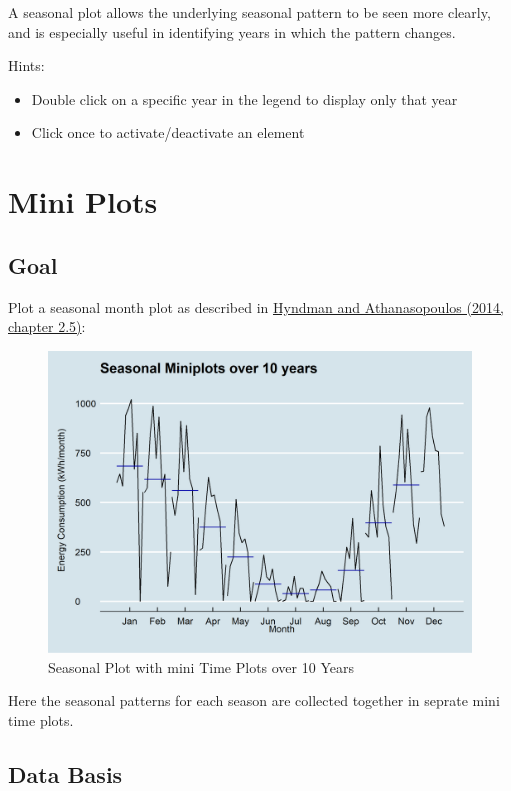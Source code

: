 \documentclass[
  a4paperpaper,
]{book}
\providecommand{\tightlist}{%
  \setlength{\itemsep}{0pt}\setlength{\parskip}{0pt}}
\begin{document}
A seasonal plot allows the underlying seasonal pattern to be seen more clearly, and is especially useful in identifying years in which the pattern changes.

Hints:

\begin{itemize}
\tightlist
\item
  Double click on a specific year in the legend to display only that year
\item
  Click once to activate/deactivate an element
\end{itemize}

\newpage

\hypertarget{mini-plots}{%
\section{Mini Plots}\label{mini-plots}}

\hypertarget{goal-1}{%
\subsection{Goal}\label{goal-1}}

Plot a seasonal month plot as described in \href{https://otexts.com/fpp2/seasonal-subseries-plots.html}{Hyndman and Athanasopoulos (2014, chapter 2.5)}:

\begin{figure}
\includegraphics[width=0.7\linewidth]{images/plotSeasonalMiniplots} \caption{Seasonal Plot with mini Time Plots over 10 Years}\label{fig:unnamed-chunk-9}
\end{figure}

Here the seasonal patterns for each season are collected together in seprate mini time plots.

\hypertarget{data-basis-1}{%
\subsection{Data Basis}\label{data-basis-1}}
\end{document}
